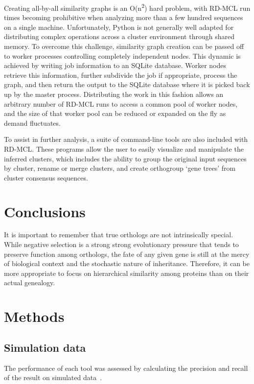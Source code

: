 \documentclass[twocolumn]{bmcart}  %
\begin{document}
Creating all-by-all similarity graphs is an O(n\textsuperscript{2}) hard problem, with RD-MCL run times becoming prohibitive when analyzing more than a few hundred sequences on a single machine.
Unfortunately, Python is not generally well adapted for distributing complex operations across a cluster environment through shared memory.
To overcome this challenge, similarity graph creation can be passed off to worker processes controlling completely independent nodes.
This dynamic is achieved by writing job information to an SQLite database.
Worker nodes retrieve this information, further subdivide the job if appropriate, process the graph, and then return the output to the SQLite database where it is picked back up by the master process.
Distributing the work in this fashion allows an arbitrary number of RD-MCL runs to access a common pool of worker nodes, and the size of that worker pool can be reduced or expanded on the fly as demand fluctuates.

To assist in further analysis, a suite of command-line tools are also included with RD-MCL\@.
These programs allow the user to easily visualize and manipulate the inferred clusters, which includes the ability to group the original input sequences by cluster, rename or merge clusters, and create orthogroup `gene trees' from cluster consensus sequences.


\section{Conclusions}\label{sec:conclusions}
It is important to remember that true orthologs are not intrinsically special.
While negative selection is a strong strong evolutionary pressure that tends to preserve function among orthologs, the fate of any given gene is still at the mercy of biological context and the stochastic nature of inheritance.
Therefore, it can be more appropriate to focus on hierarchical similarity among proteins than on their actual genealogy.


\section{Methods}\label{sec:methods}
\subsection{Simulation data}\label{subsec:simulationData}
The performance of each tool was assessed by calculating the precision and recall of the result on simulated data~\cite{Emms:2015ig}.
\end{document}
